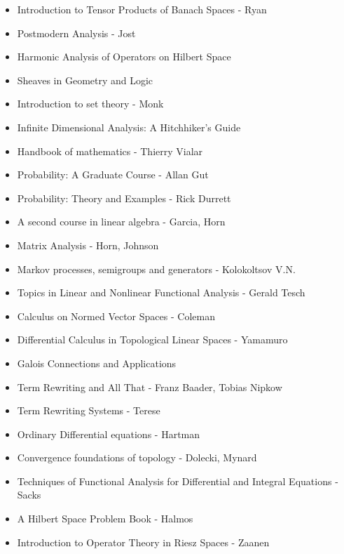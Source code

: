 \documentclass{report}
\begin{document}
\begin{itemize}
\item Introduction to Tensor Products of Banach Spaces - Ryan
\item Postmodern Analysis - Jost
\item Harmonic Analysis of Operators on Hilbert Space
\item Sheaves in Geometry and Logic
\item Introduction to set theory - Monk
\item Infinite Dimensional Analysis: A Hitchhiker’s Guide
\item Handbook of mathematics - Thierry Vialar
\item Probability: A Graduate Course - Allan Gut
\item Probability: Theory and Examples - Rick Durrett
\item A second course in linear algebra - Garcia, Horn
\item Matrix Analysis - Horn, Johnson
\item Markov processes, semigroups and generators - Kolokoltsov V.N.
\item Topics in Linear and Nonlinear Functional Analysis - Gerald Tesch
\item Calculus on Normed Vector Spaces - Coleman
\item Differential Calculus in Topological Linear Spaces - Yamamuro
\item Galois Connections and Applications
\item Term Rewriting and All That - Franz Baader, Tobias Nipkow
\item Term Rewriting Systems - Terese
\item Ordinary Differential equations - Hartman
\item Convergence foundations of topology - Dolecki, Mynard
\item Techniques of Functional Analysis for Differential and Integral Equations - Sacks
\item A Hilbert Space Problem Book - Halmos
\item Introduction to Operator Theory in Riesz Spaces - Zaanen
\end{itemize}
\end{document}
